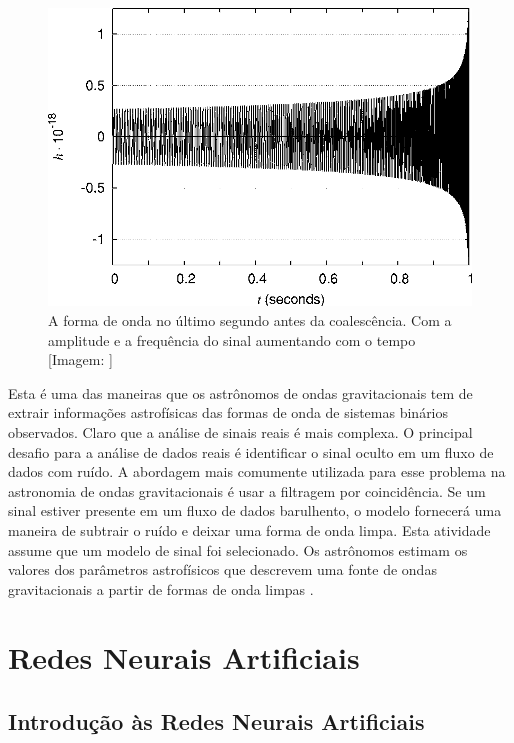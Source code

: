 \begin{figure}[ht]
\centering
\includegraphics[width=.9\textwidth]{figuras/metade.png}
\caption{A forma de onda no último segundo antes da coalescência. Com a amplitude e a frequência do sinal aumentando com o tempo [Imagem: \cite{rubbo2007hands}]}
\label{figmetade}
\end{figure}

Esta é uma das maneiras que os astrônomos de ondas gravitacionais tem de extrair informações astrofísicas das formas de onda de sistemas binários observados. Claro que a análise de sinais reais é mais complexa. O principal desafio para a análise de dados reais é identificar o sinal oculto em um fluxo de dados com ruído. A abordagem mais comumente utilizada para esse problema na astronomia de ondas gravitacionais é usar a filtragem por coincidência. Se um sinal estiver presente em um fluxo de dados barulhento, o modelo fornecerá uma maneira de subtrair o ruído e deixar uma forma de onda limpa. Esta atividade assume que um modelo de sinal foi selecionado. Os astrônomos estimam os valores dos parâmetros astrofísicos que descrevem uma fonte de ondas gravitacionais a partir de formas de onda limpas \cite{rubbo2007hands}. 

\section{Redes Neurais Artificiais}
\label{sec:redes-neurais-artificiais}

\subsection{Introdução às Redes Neurais Artificiais}
\label{subsec:redes-neurais-artificiais:introducao}

